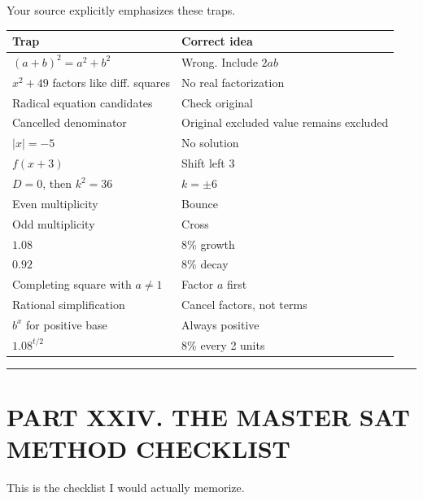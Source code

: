 \documentclass[
]{article}
\newcounter{none} %
\begin{document}
Your source explicitly emphasizes these traps.

{\def\LTcaptype{none} %
\begin{longtable}[]{@{}ll@{}}
\toprule\noalign{}
Trap & Correct idea \\
\midrule\noalign{}
\endhead
\bottomrule\noalign{}
\endlastfoot
\((a+b)^2=a^2+b^2\) & Wrong. Include \(2ab\) \\
\(x^2+49\) factors like diff. squares & No real factorization \\
Radical equation candidates & Check original \\
Cancelled denominator & Original excluded value remains excluded \\
\(|x|=-5\) & No solution \\
\(f(x+3)\) & Shift left 3 \\
\(D=0\), then \(k^2=36\) & \(k=\pm6\) \\
Even multiplicity & Bounce \\
Odd multiplicity & Cross \\
\(1.08\) & 8\% growth \\
\(0.92\) & 8\% decay \\
Completing square with \(a\neq1\) & Factor \(a\) first \\
Rational simplification & Cancel factors, not terms \\
\(b^x\) for positive base & Always positive \\
\(1.08^{t/2}\) & 8\% every 2 units \\
\end{longtable}
}

\begin{center}\rule{0.5\linewidth}{0.5pt}\end{center}

\section{PART XXIV. THE MASTER SAT METHOD
CHECKLIST}\label{part-xxiv.-the-master-sat-method-checklist}

This is the checklist I would actually memorize.
\end{document}
